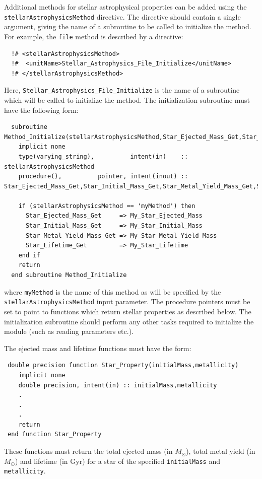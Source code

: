 Additional methods for stellar astrophysical properties can be added using the {\tt stellarAstrophysicsMethod} directive. The directive should contain a single argument, giving the name of a subroutine to be called to initialize the method. For example, the {\tt file} method is described by a directive:
\begin{verbatim}
  !# <stellarAstrophysicsMethod>
  !#  <unitName>Stellar_Astrophysics_File_Initialize</unitName>
  !# </stellarAstrophysicsMethod>
\end{verbatim}
Here, {\tt Stellar\_Astrophysics\_File\_Initialize} is the name of a subroutine which will be called to initialize the method. The initialization subroutine must have the following form:
\begin{verbatim}
  subroutine Method_Initialize(stellarAstrophysicsMethod,Star_Ejected_Mass_Get,Star_Initial_Mass_Get,Star_Metal_Yield_Mass_Get,Star_Lifetime_Get)
    implicit none
    type(varying_string),          intent(in)    :: stellarAstrophysicsMethod
    procedure(),          pointer, intent(inout) :: Star_Ejected_Mass_Get,Star_Initial_Mass_Get,Star_Metal_Yield_Mass_Get,Star_Lifetime_Get
    
    if (stellarAstrophysicsMethod == 'myMethod') then
      Star_Ejected_Mass_Get     => My_Star_Ejected_Mass
      Star_Initial_Mass_Get     => My_Star_Initial_Mass
      Star_Metal_Yield_Mass_Get => My_Star_Metal_Yield_Mass
      Star_Lifetime_Get         => My_Star_Lifetime
    end if
    return
  end subroutine Method_Initialize
\end{verbatim}
where {\tt myMethod} is the name of this method as will be specified by the {\tt stellarAstrophysicsMethod} input parameter. The procedure pointers must be set to point to functions which return stellar properties as described below. The initialization subroutine should perform any other tasks required to initialize the module (such as reading parameters etc.).

The ejected mass and lifetime functions must have the form:
\begin{verbatim}
 double precision function Star_Property(initialMass,metallicity)
    implicit none
    double precision, intent(in) :: initialMass,metallicity
    .
    .
    .
    return
 end function Star_Property
\end{verbatim}
These functions must return the total ejected mass (in $M_\odot$), total metal yield (in $M_\odot$) and lifetime (in Gyr) for a star of the specified {\tt initialMass} and {\tt metallicity}.

